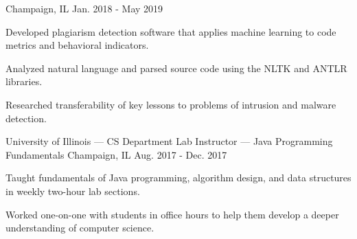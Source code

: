 \begin{cventries}
{Champaign, IL} %
{Jan. 2018 - May 2019} %
{
	\begin{cvitems} %
		\item {Developed plagiarism detection software that applies machine learning to code metrics and behavioral indicators.}
		\item {Analyzed natural language and parsed source code using the NLTK and ANTLR libraries.}
		\item {Researched transferability of key lessons to problems of intrusion and malware detection.}
	\end{cvitems}
}
\cventry
{University of Illinois — CS Department} %
{Lab Instructor — Java Programming Fundamentals} %
{Champaign, IL} %
{Aug. 2017 - Dec. 2017} %
{
	\begin{cvitems} %
		\item {Taught fundamentals of Java programming, algorithm design, and data structures in weekly two-hour lab sections.}
		\item {Worked one-on-one with students in office hours to help them develop a deeper understanding of computer science.}
	\end{cvitems}
}
\end{cventries}

